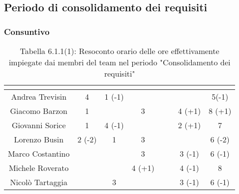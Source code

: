 \subsection{Periodo di consolidamento dei requisiti}
\subsubsection{Consuntivo}
\renewcommand{\arraystretch}{1.5}
\begin{table}[H]
\begin{center}
\begin{tabular}{|c|c|c|c|c|c|c|c|}
\hline
\rowcolor{title_row}
\textbf{\color{title_text}{Nome}} & \textbf{\color{title_text}{Resp.}} & \textbf{\color{title_text}{Ammi.}} & \textbf{\color{title_text}{Analist.}} & \textbf{\color{title_text}{Progett.}} & \textbf{\color{title_text}{Program.}} & \textbf{\color{title_text}{Verific.}} & \textbf{\color{title_text}{Totale}} \\ \hline
Andrea Trevisin  & 4 & 1 (-1) & & & & & 5(-1) \\ \hline
Giacomo Barzon   & 1 & & 3 & & & 4 (+1) & 8 (+1) \\ \hline
Giovanni Sorice  & 1 & 4 (-1) & & & & 2 (+1) & 7  \\ \hline
Lorenzo Busin    & 2 (-2) & 1 & 3 & & & & 6 (-2) \\ \hline
Marco Costantino & & & 3 & & & 3 (-1) & 6 (-1) \\ \hline
Michele Roverato & & & 4 (+1) & & & 4 (-1) & 8 \\ \hline
Nicolò Tartaggia & & 3 & & & & 3 (-1) & 6 (-1)  \\ \hline
\end{tabular}
\caption{Tabella 6.1.1(1): Resoconto orario delle ore effettivamente impiegate dai membri del team nel periodo "Consolidamento dei requisiti"\label{}}
\end{center}
\end{table}
\renewcommand{\arraystretch}{1}

